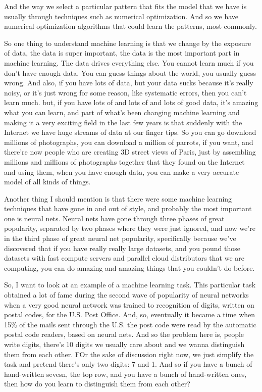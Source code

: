 \documentclass[fleqn,10pt]{olplainarticle}
\theoremstyle{definition}
\theoremstyle{remark}
\begin{document}
And the way we select a particular pattern that fits the model that we have is usually through techniques such as numerical optimization. And so we have numerical optimization algorithms that could learn the patterns, most commonly.

So one thing to understand machine learning is that we change by the exposure of data, the data is super important, the data is the most important part in machine learning. The data drives everything else. You cannot learn much if you don't have enough data. You can guess things about the world, you usually guess wrong. And also, if you have lots of data, but your data sucks because it's really noisy, or it's just wrong for some reason, like systematic errors, then you can't learn much. but, if you have lots of and lots of and lots of good data, it's amazing what you can learn, and part of what's been changing machine learning and making it a very exciting field in the last few years is that suddenly with the Internet we have huge streams of data at our finger tips. So you can go download millions of photographs, you can download a million of parrots, if you want, and there're now people who are creating 3D street views of Paris, just by assembling millions and millions of photographs together that they found on the Internet and using them, when you have enough data, you can make a very accurate model of all kinds of things. 

Another thing I should mention is that there were some machine learning techniques that have gone in and out of style, and probably the most important one is neural nets. Neural nets have gone through three phases of great popularity, separated by two phases where they were just ignored, and now we're in the third phase of great neural net popularity, specifically because we've discovered that if you have really really large datasets, and you pound those datasets with fast compute servers and parallel cloud distributors that we are computing, you can do amazing and amazing things that you couldn't do before. 

So, I want to look at an example of a machine learning task. This particular task obtained a lot of fame during the second wave of popularity of neural networks when a very good neural network was trained to recognition of digits, written on postal codes, for the U.S. Post Office. And, so, eventually it became a time when 15\% of the mails sent through the U.S. the post code were read by the automatic postal code readers, based on neural nets. And so the problem here is, people write digits, there's 10 digits we usually care about and we wanna distinguish them from each other. FOr the sake of discussion right now, we just simplify the task and pretend there's only two digits: 7 and 1. And so if you have a bunch of hand-written sevesn, the top row, and you have a bunch of hand-written ones, then how do you learn to distinguish them from each other?
\end{document}
